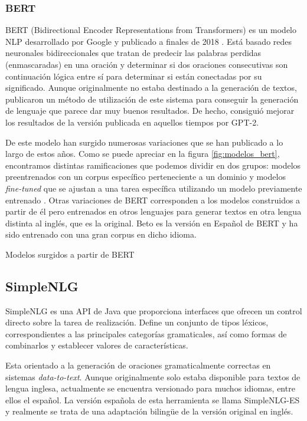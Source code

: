 \subsubsection{BERT}
BERT (Bidirectional Encoder Representations from Transformers) es un modelo NLP desarrollado por Google y publicado a finales de 2018 \citep{Devlin2019BERTPO}. Está basado redes neuronales bidireccionales que tratan de predecir las palabras perdidas (enmascaradas) en una oración y determinar si dos oraciones consecutivas son continuación lógica entre sí para determinar si están conectadas por su significado. Aunque originalmente no estaba destinado a la generación de textos, \cite{wang-cho-2019-bert} publicaron un método de utilización de este sistema para conseguir la generación de lenguaje que parece dar muy buenos resultados. De hecho, consiguió mejorar los resultados de la versión publicada en aquellos tiempos por GPT-2. 

De este modelo han surgido numerosas variaciones que se han publicado a lo largo de estos años. Como se puede apreciar en la figura \ref{fig:modelos_bert}, encontramos distintas ramificaciones que podemos dividir en dos grupos: modelos preentrenados con un corpus específico perteneciente a un dominio y modelos \textit{fine-tuned} que se ajustan a una tarea específica utilizando un modelo previamente entrenado \citep{rajasekharan_2019}.
Otras variaciones de BERT corresponden a los modelos construidos a partir de él pero entrenados en otros lenguajes para generar textos en otra lengua distinta al inglés, que es la original. Beto es la versión en Español de BERT \citep{CaneteCFP2020} y ha sido entrenado con una gran corpus en dicho idioma.

%
{Modelos surgidos a partir de BERT}


\subsection{SimpleNLG}
SimpleNLG es una API de Java que proporciona interfaces que ofrecen un control directo sobre la tarea de realización. Define un conjunto de tipos léxicos, correspondientes a las principales categorías gramaticales, así como formas de combinarlos y establecer valores de características. 

Esta orientado a la generación de oraciones gramaticalmente correctas en sistemas \textit{data-to-text}. Aunque originalmente solo estaba disponible para textos de lengua inglesa, actualmente se encuentra versionado para muchos idiomas, entre ellos el español. La versión española de esta herramienta se llama SimpleNLG-ES y realmente se trata de una adaptación bilingüe de la versión original en inglés.

